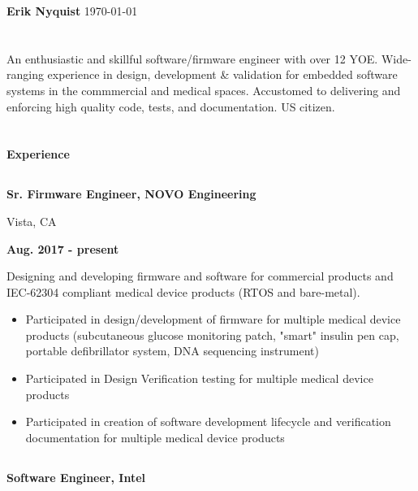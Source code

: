 \documentclass[6pt]{article}
\begin{document}
\begin{minipage}{38em}
\bigskip{}
\bigskip{}
\bigskip{}
%
%
{\Huge \bfseries Erik Nyquist}
{\hfill \today}
\section*{}
\begin{flushleft}
An enthusiastic and skillful software/firmware engineer with over 12 YOE. Wide-ranging
experience in design, development \& validation for embedded software systems in the
commmercial and medical spaces. Accustomed to delivering and enforcing high quality code,
tests, and documentation. US citizen.
\end{flushleft}
\section*{}
{\Large \bfseries Experience}

\dotfill
%
%
\subsection*{}
\begin{minipage}{22em}
{\bfseries Sr. Firmware Engineer, NOVO Engineering

Vista, CA}
\end{minipage}
\hfill
\begin{minipage}{10em}
{\bfseries Aug. 2017 - present}
\end{minipage}
\begin{flushleft}
Designing and developing firmware and software for commercial products and IEC-62304
compliant medical device products (RTOS and bare-metal).
\begin{itemize}
    \item Participated in design/development of firmware for multiple medical
          device products (subcutaneous glucose monitoring patch, "smart" insulin pen
          cap, portable defibrillator system, DNA sequencing instrument)
    \item Participated in Design Verification testing for multiple medical device products
    \item Participated in creation of software development lifecycle and
          verification documentation for multiple medical device products
\end{itemize}
\end{flushleft}
\dotfill
%
%
\subsection*{}
\begin{minipage}{20em}
{\bfseries Software Engineer, Intel

}
\end{minipage}
\end{minipage}
\end{document}
